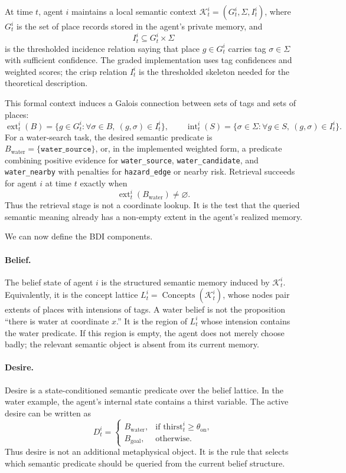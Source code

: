 \documentclass{article}
\begin{document}
At time $t$, agent $i$ maintains a local semantic context
$\mathcal{K}_t^i=(G_t^i,\Sigma,I_t^i)$, where $G_t^i$ is the set of
place records stored in the agent's private memory, and
\[
I_t^i \subseteq G_t^i \times \Sigma
\]
is the thresholded incidence relation saying that place $g\in G_t^i$
carries tag $\sigma\in\Sigma$ with sufficient confidence. The graded
implementation uses tag confidences and weighted scores; the crisp
relation $I_t^i$ is the thresholded skeleton needed for the theoretical
description.

This formal context induces a Galois connection between sets of tags
and sets of places:
\[
\operatorname{ext}_t^i(B)=\{g\in G_t^i:\forall\sigma\in B,\ (g,\sigma)\in I_t^i\},
\qquad
\operatorname{int}_t^i(S)=\{\sigma\in\Sigma:\forall g\in S,\ (g,\sigma)\in I_t^i\}.
\]
For a water-search task, the desired semantic predicate is
$B_{\mathrm{water}}=\{\texttt{water\_source}\}$, or, in the implemented
weighted form, a predicate combining positive evidence for
\texttt{water\_source}, \texttt{water\_candidate}, and
\texttt{water\_nearby} with penalties for \texttt{hazard\_edge} or
nearby risk. Retrieval succeeds for agent $i$ at time $t$ exactly when
\[
\operatorname{ext}_t^i(B_{\mathrm{water}})\neq\varnothing .
\]
Thus the retrieval stage is not a coordinate lookup. It is the test
that the queried semantic meaning already has a non-empty extent in the
agent's realized memory.

We can now define the BDI components.

\paragraph{Belief.} The belief state of agent $i$ is the structured
semantic memory induced by $\mathcal{K}_t^i$. Equivalently, it is the
concept lattice $L_t^i=\operatorname{Concepts}(\mathcal{K}_t^i)$, whose
nodes pair extents of places with intensions of tags. A water belief is
not the proposition ``there is water at coordinate $x$.'' It is the
region of $L_t^i$ whose intension contains the water predicate. If this
region is empty, the agent does not merely choose badly; the relevant
semantic object is absent from its current memory.

\paragraph{Desire.} Desire is a state-conditioned semantic predicate
over the belief lattice. In the water example, the agent's internal
state contains a thirst variable. The active desire can be written as
\[
D_t^i =
\begin{cases}
B_{\mathrm{water}}, & \text{if } \mathrm{thirst}_t^i\geq\theta_{\mathrm{on}},\\
B_{\mathrm{goal}}, & \text{otherwise.}
\end{cases}
\]
Thus desire is not an additional metaphysical object. It is the rule
that selects which semantic predicate should be queried from the
current belief structure.
\end{document}
